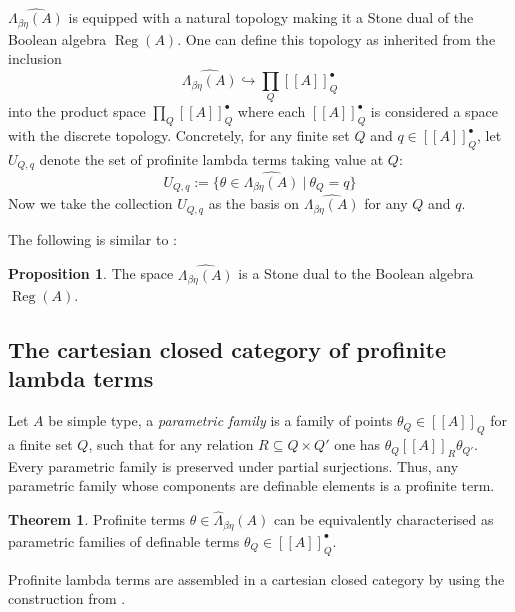 \documentclass[8pt]{article}
\theoremstyle{definition}
\theoremstyle{definition}
\newtheorem{theorem}{Theorem}[section]
\theoremstyle{definition}
\theoremstyle{definition}
\theoremstyle{definition}
\theoremstyle{definition}
\theoremstyle{definition}
\newtheorem{prop}{Proposition}[section]
\theoremstyle{definition}
\theoremstyle{definition}
\theoremstyle{definition}
\theoremstyle{definition}
\theoremstyle{definition}
\theoremstyle{definition}
\theoremstyle{definition}
\theoremstyle{question}
\begin{document}
$\widehat{\Lambda_{\beta\eta}(A)}$ is equipped with a natural topology making it a Stone dual of the Boolean algebra
$\operatorname{Reg}(A)$. One can define this topology as inherited from the inclusion
\[
\widehat{\Lambda_{\beta\eta}(A)} \hookrightarrow \prod \limits_{Q} [\![A]\!]_Q^{\bullet}
\]
into the product space $\prod \limits_{Q} [\![A]\!]_Q^{\bullet}$ where each $[\![A]\!]_Q^{\bullet}$ is considered a space
with the discrete topology. Concretely, for any finite set $Q$ and $q \in [\![A]\!]_Q^{\bullet}$,
let $U_{Q,q}$ denote the set of profinite lambda terms taking value at $Q$:
\[
U_{Q,q} := \{ \theta \in \widehat{\Lambda_{\beta\eta}(A)} \: | \: \theta_Q = q \}
\]
Now we take the collection $U_{Q,q}$ as the basis on $\widehat{\Lambda_{\beta\eta}(A)}$
for any $Q$ and $q$.

The following is similar to \cite[Section 4.2]{gehrke2016stone}:

\begin{prop}
  The space $\widehat{\Lambda_{\beta\eta}(A)}$ is a Stone dual to the Boolean algebra $\operatorname{Reg}(A)$.
\end{prop}

\subsection{The cartesian closed category of profinite lambda terms}

Let $A$ be simple type, a \emph{parametric family} is a family of points $\theta_Q \in [\![A]\!]_Q$ for a finite
set $Q$, such that for any relation $R \subseteq Q \times Q'$ one has $\theta_Q [\![A]\!]_R \theta_{Q'}$.
Every parametric family is preserved under partial surjections. Thus, any parametric family
whose components are definable elements is a profinite term. 

\begin{theorem}
  Profinite terms $\theta \in \widehat{\Lambda}_{\beta \eta}(A)$ can be equivalently characterised as
  parametric families of definable terms $\theta_Q \in [\![A]\!]_Q^{\bullet}$.
\end{theorem}

Profinite lambda terms are assembled in a cartesian closed category by using the construction from \cite{jacq2018categorical}.
\end{document}
